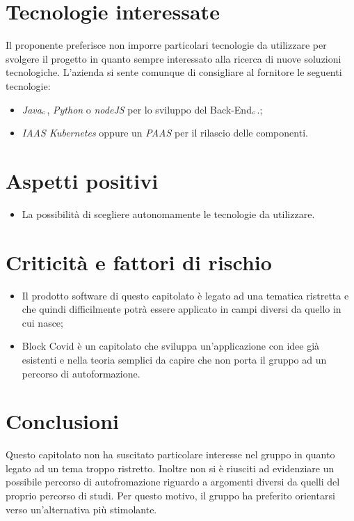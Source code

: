 \section{Tecnologie interessate} \label{C1TecnologieInteressate}
Il proponente preferisce non imporre particolari tecnologie da utilizzare per svolgere il progetto in quanto sempre interessato alla ricerca di nuove soluzioni tecnologiche. L'azienda si sente comunque di consigliare al fornitore le seguenti tecnologie: 
\begin{itemize}
	\item \textit{Java}$_{\scaleto{G}{3pt}}$, \textit{Python} o \textit{nodeJS} per lo sviluppo del Back-End$_{\scaleto{G}{3pt}}$.;
	\item \textit{IAAS Kubernetes} oppure un \textit{PAAS} per il rilascio delle componenti.
\end{itemize}
\section{Aspetti positivi} \label{C1AspettiPositivi}
\begin{itemize}
	\item La possibilità di scegliere autonomamente le tecnologie da utilizzare.
\end{itemize}
\section{Criticità e fattori di rischio} \label{C1CriticitàEFattoriDiRischio}
\begin{itemize}
	\item Il prodotto software di questo capitolato è legato ad una tematica ristretta e che quindi difficilmente potrà essere applicato in campi diversi da quello in cui nasce;
	\item Block Covid è un capitolato che sviluppa un'applicazione con idee già esistenti e nella teoria semplici da capire che non porta il gruppo ad un percorso di autoformazione.
\end{itemize}
\section{Conclusioni} \label{C1Conclusioni}
Questo capitolato non ha suscitato particolare interesse nel gruppo in quanto legato ad un tema troppo ristretto. Inoltre non si è riusciti ad evidenziare un possibile percorso di autofromazione riguardo a argomenti diversi da quelli del proprio percorso di studi. Per questo motivo, il gruppo ha preferito orientarsi verso un'alternativa più stimolante.